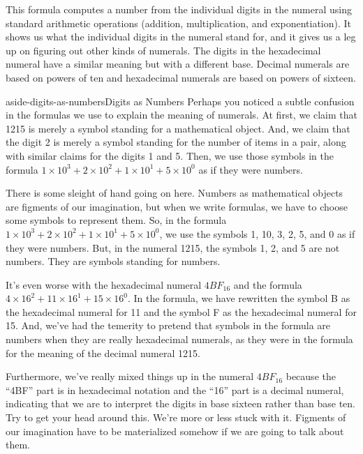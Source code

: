 This formula computes a number from the individual digits
in the numeral using standard arithmetic operations
(addition, multiplication, and exponentiation).
It shows us what the individual digits in the numeral stand for,
and it gives us a leg up on figuring out other kinds of numerals.
The digits in the hexadecimal numeral have a similar meaning
but with a different base. Decimal numerals are based on
powers of ten and hexadecimal numerals are based on powers of sixteen.

\begin{aside}{aside-digits-as-numbers}{Digits as Numbers}
Perhaps you noticed a subtle confusion in the formulas we use
to explain the meaning of numerals. At first, we claim that
1215 is merely a symbol standing for a mathematical object.
And, we claim that the digit 2 is merely a symbol standing
for the number of items in a pair, along with similar
claims for the digits 1 and 5.
Then, we use those symbols in the formula
$1 \times 10^3 + 2 \times 10^2 + 1 \times 10^1 + 5 \times 10^0$
as if they were numbers.

There is some sleight of hand going on here.
Numbers as mathematical objects are figments of our imagination,
but when we write formulas, we have to choose some symbols to
represent them.
So, in the formula $1 \times 10^3 + 2 \times 10^2 + 1 \times 10^1 + 5 \times 10^0$,
we use the symbols 1, 10, 3, 2, 5, and 0 as if they were numbers.
But, in the numeral 1215, the symbols 1, 2, and 5 are not numbers.
They are symbols standing for numbers.

It's even worse with the hexadecimal numeral $4BF_{16}$
and the formula $4 \times 16^2 + 11 \times 16^1 + 15 \times 16^0$.
In the formula, we have rewritten the symbol B
as the hexadecimal numeral for 11
and the symbol F as the hexadecimal numeral for 15.
And, we've had the temerity to pretend that symbols
in the formula are numbers when they are really hexadecimal numerals,
as they were in the formula for the meaning of the decimal numeral 1215.

Furthermore, we've really mixed things up in the numeral
$4BF_{16}$ because the ``4BF'' part is in hexadecimal notation
and the ``16'' part is a decimal numeral, indicating that we are
to interpret the digits in base sixteen rather than base ten.
Try to get your head around this.
We're more or less stuck with it. Figments of our imagination have
to be materialized somehow if we are going to talk about
them.
\end{aside}

